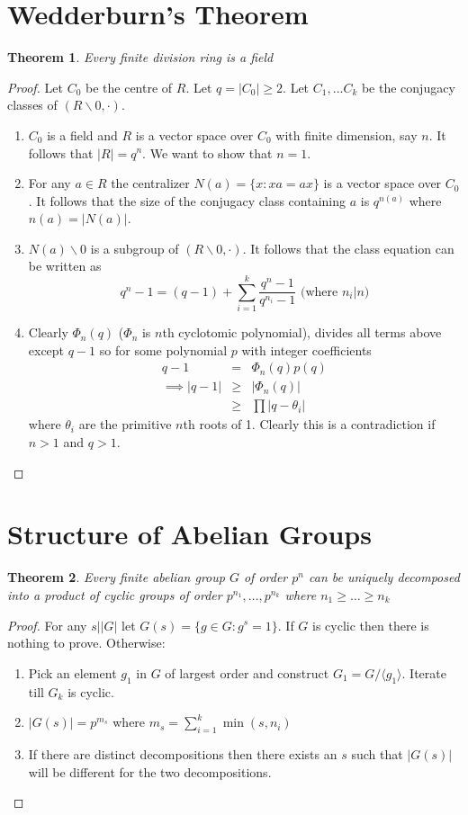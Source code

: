\documentclass{sig-alternate}
\newtheorem{theorem}{Theorem}[section]
\begin{document}
\section{Wedderburn's Theorem}
\begin{theorem}
Every finite division ring is a field
\end{theorem}
\begin{proof} Let $C_0$ be the centre of $R$. Let $q = |C_0| \geq 2$. Let $C_1, \ldots C_k$ be the conjugacy classes of $(R\backslash 0, \cdot)$.
\begin{enumerate}
\item $C_0$ is a field and $R$ is a vector space over $C_0$ with finite dimension, say $n$. It follows that $|R| = q^n$. We want to show that $n=1$.
\item For any $a \in R$ the centralizer $N(a) = \{x: xa = ax\}$ is a vector space over $C_0$. It follows that the size of the conjugacy class containing $a$ is $q^{n(a)}$ where $n(a) = |N(a)|$.
\item $N(a)\backslash 0$ is a subgroup of $(R\backslash 0, \cdot)$. It follows that the class equation can be written as
\[ q^n - 1 =  (q - 1) + \sum_{i = 1}^k\frac{q^n - 1}{q^{n_i} - 1} \mbox{ (where } n_i | n \mbox{)}\]
\item Clearly $\Phi_n(q)$ ($\Phi_n$ is $n$th cyclotomic polynomial), divides all terms above except $q-1$ so for some polynomial $p$ with integer coefficients
\begin{eqnarray*} q - 1 & = & \Phi_n(q)p(q) \\ \implies |q-1| & \geq & |\Phi_n(q)| \\ & \geq & \prod |q - \theta_i| \end{eqnarray*}
where $\theta_i$ are the primitive $n$th roots of 1. Clearly this is a contradiction if $n>1$ and $q>1$.
\end{enumerate}
\end{proof}
\section{Structure of Abelian Groups}
\begin{theorem}
Every finite abelian group $G$ of order $p^n$ can be uniquely decomposed into a product of cyclic groups of order $p^{n_1}, \ldots, p^{n_k}$ where $n_1 \geq \ldots \geq n_k$
\end{theorem}
\begin{proof} For any $s||G|$ let $G(s) = \{g \in G: g^s = 1\}$. If $G$ is cyclic then there is nothing to prove. Otherwise:
\begin{enumerate}
\item Pick an element $g_1$ in $G$ of largest order and construct $G_1 = G/\langle g_1\rangle$. Iterate till $G_k$ is cyclic.
\item $|G(s)| = p^{m_s}$ where $m_s = \sum_{i=1}^{k} \min(s, n_i)$
\item If there are distinct decompositions then there exists an $s$ such that $|G(s)|$ will be different for the two decompositions.
\end{enumerate}
\end{proof}
\end{document}

